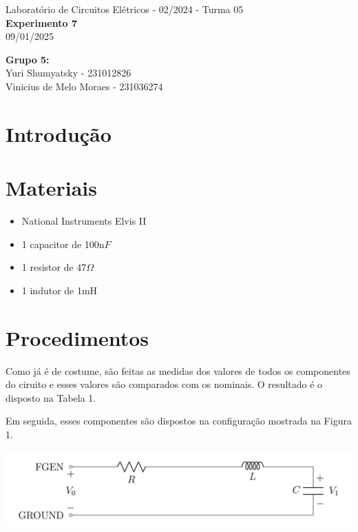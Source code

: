 \documentclass[a4 paper]{article}
\newcommand{\parag}{\hspace{30pt}}
\begin{document}
\justifying
\begin{center}{\large Laboratório de Circuitos Elétricos - 02/2024 - Turma 05}\\
{\large \textbf{Experimento 7}}\\ 
09/01/2025
\end{center}

\vspace{500pt}
 \noindent\textbf{Grupo 5:}\\
 Yuri Shumyatsky - 231012826\\
Vinicius de Melo Moraes - 231036274\\



\vspace{30pt}
\newpage

\section{Introdução}


\section{Materiais}
	\begin{itemize}
	\item National Instruments Elvis II
	\item 1 capacitor de 100n$F$
	\item 1 resistor de 47$\Omega$
	\item 1 indutor de 1mH
	\end{itemize}

\newpage
\section{Procedimentos}
\parag Como já é de costume, são feitas as medidas dos valores de todos os componentes do ciruito e esses valores são comparados com os nominais. O resultado é o disposto na Tabela 1.



Em seguida, esses componentes são dispostos na configuração mostrada na Figura 1.

\begin{table}[h]
\centering
\includegraphics[scale=0.5]{figuras/circuito1}
\end{table}
\end{document}
